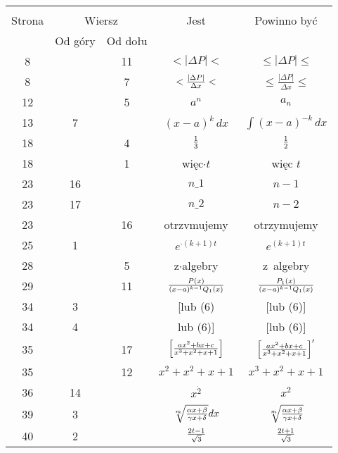 \documentclass[a4paper,11pt]{article}
\begin{document}
\vspace{\spaceFour}


\begin{center}
  \begin{tabular}{|c|c|c|c|c|}
    \hline
    & \multicolumn{2}{c|}{} & & \\
    Strona & \multicolumn{2}{c|}{Wiersz} & Jest
                              & Powinno być \\ \cline{2-3}
    & Od góry & Od dołu & & \\
    \hline
    8   & & 11 & $< | \Delta P | <$ & $\leq | \Delta P | \leq$ \\
    8   & &  7 & $< \frac{ | \Delta P | }{ \Delta x } <$
           & $\leq \frac{ | \Delta P | }{ \Delta x } \leq$ \\
    12  & &  5 & $a^{ n }$ & $a_{ n }$ \\
    13  &  7 & & $( x - a )^{ k }\, dx$ & $\int ( x - a )^{ -k }\, dx$ \\
    18  & &  4 & $\frac{ 1 }{ 3 }$ & $\frac{ 1 }{ 2 }$ \\
    18  & &  1 & więc$\cdot t$ & więc $t$ \\
    23  & 16 & & $n \_ 1$ & $n - 1$ \\
    23  & 17 & & $n \_ 2$ & $n - 2$ \\
    23  & & 16 & otrzvmujemy & otrzymujemy \\
    25  &  1 & & $e^{ \cdot (k + 1) t}$ & $e^{ (k + 1) t}$ \\
    28  & &  5 & z$\cdot$algebry & z~algebry \\
    29  & & 11 & $\frac{ P(x) }{ (x - a)^{k - 1} Q_{ 1 }(x) }$
           & $\frac{ P_{ 1 }(x) }{ (x - a)^{k - 1} Q_{ 1 }(x) }$ \\
    34  &  3 & & [lub (6) & [lub (6)] \\
    34  &  4 & & lub (6)] & [lub (6)] \\
    35  & & 17 & $\left[ \frac{ a x^{ 2 } + b x + c }
                 { x^{ 3 } + x^{ 2 } + x + 1 } \right]$
           & $\left[ \frac{ a x^{ 2 } + b x + c }
             { x^{ 3 } + x^{ 2 } + x + 1 } \right]'$ \\
    35  & & 12 & $x^{ 2 } + x^{ 2 } + x + 1$
           & $x^{ 3 } + x^{ 2 } + x + 1$ \\
    36  & 14 & & $x^{ \dot{ 2 } }$ & $x^{ 2 }$ \\
    39  &  3 & & $\sqrt[ m ]{ \frac{ \alpha x + \beta }{ \gamma x + \delta } } dx$
           & $\sqrt[ m ]{ \frac{ \alpha x + \beta }{ \gamma x + \delta } }$ \\
    40  &  2 & & $\frac{ 2t - 1 }{ \sqrt{ 3 } }$
           & $\frac{ 2t + 1 }{ \sqrt{ 3 } }$ \\
    \hline
  \end{tabular}


\end{center}
\end{document}
